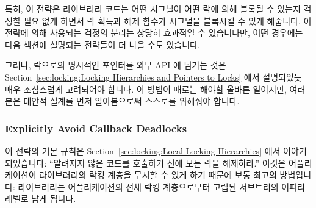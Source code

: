 특히, 이 전략은 라이브러리 코드는 어떤 시그널이 어떤 락에 의해 블록될 수 있는지
걱정할 필요 없게 하면서 락 획득과 해제 함수가 시그널을 블록시킬 수 있게
해줍니다.
이 전략에 의해 사용되는 걱정의 분리는 상당히 효과적일 수 있습니다만, 어떤
경우에는 다음 섹션에 설명되는 전략들이 더 나을 수도 있습니다.

그러나, 락으로의 명시적인 포인터를 외부 API 에 넘기는 것은
Section~\ref{sec:locking:Locking Hierarchies and Pointers to Locks}
에서 설명되었듯 매우 조심스럽게 고려되어야 합니다.
이 방법이 때로는 해야할 올바른 일이지만, 여러분은 대안적 설계를 먼저
알아봄으로써 스스로를 위해줘야 합니다.

\subsubsection{Explicitly Avoid Callback Deadlocks}
\label{sec:locking:Explicitly Avoid Callback Deadlocks}

이 전략의 기본 규칙은
Section~\ref{sec:locking:Local Locking Hierarchies} 에서 이야기 되었습니다:
``알려지지 않은 코드를 호출하기 전에 모든 락을 해제하라.''
이것은 어플리케이션이 라이브러리의 락킹 계층을 무시할 수 있게 하기 때문에 보통
최고의 방법입니다: 라이브러리는 어플리케이션의 전체 락킹 계층으로부터 고립된
서브트리의 이파리 레벨로 남게 됩니다.

